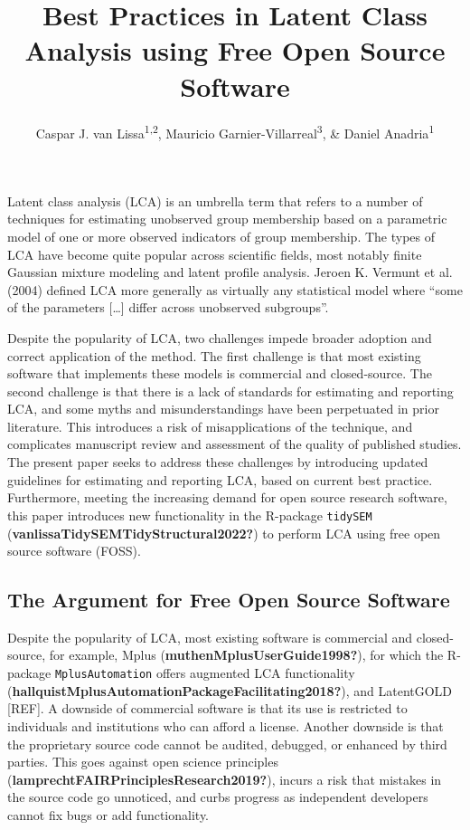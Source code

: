 \documentclass[
  ,man,floatsintext]{apa6}
\title{Best Practices in Latent Class Analysis using Free Open Source Software}
\author{Caspar J. van Lissa\textsuperscript{1,2}, Mauricio Garnier-Villarreal\textsuperscript{3}, \& Daniel Anadria\textsuperscript{1}}
\date{}
\affiliation{\vspace{0.5cm}\textsuperscript{1} Utrecht University, Methodology \& Statistics\\\textsuperscript{2} Open Science Community Utrecht\\\textsuperscript{3} Vrije Universiteit Amsterdam, Sociology}
\begin{document}
\maketitle

Latent class analysis (LCA) is an umbrella term that refers to a number
of techniques for estimating unobserved group membership based on a
parametric model of one or more observed indicators of group membership.
The types of LCA have become quite popular across scientific fields,
most notably finite Gaussian mixture modeling and latent profile
analysis. Jeroen K. Vermunt et al. (2004) defined LCA more generally as virtually
any statistical model where ``some of the parameters {[}\ldots{]} differ across
unobserved subgroups''.

Despite the popularity of LCA, two challenges impede broader adoption
and correct application of the method. The first challenge is that most
existing software that implements these models is commercial and
closed-source. The second challenge is that there is a lack of standards
for estimating and reporting LCA, and some myths and misunderstandings
have been perpetuated in prior literature. This introduces a risk of
misapplications of the technique, and complicates manuscript review and
assessment of the quality of published studies. The present paper seeks
to address these challenges by introducing updated guidelines for
estimating and reporting LCA, based on current best practice.
Furthermore, meeting the increasing demand for open source research
software, this paper introduces new functionality in the R-package
\texttt{tidySEM} (\textbf{vanlissaTidySEMTidyStructural2022?}) to perform LCA using free
open source software (FOSS).

\hypertarget{the-argument-for-free-open-source-software}{%
\subsection{The Argument for Free Open Source Software}\label{the-argument-for-free-open-source-software}}

Despite the popularity of LCA, most existing software is commercial and
closed-source, for example, Mplus (\textbf{muthenMplusUserGuide1998?}), for which
the R-package \texttt{MplusAutomation} offers augmented LCA functionality
(\textbf{hallquistMplusAutomationPackageFacilitating2018?}), and LatentGOLD
{[}REF{]}.
A
downside of commercial software is that its use is restricted to
individuals and institutions who can afford a license. Another downside
is that the proprietary source code cannot be audited, debugged, or
enhanced by third parties. This goes against open science principles
(\textbf{lamprechtFAIRPrinciplesResearch2019?}), incurs a risk that mistakes in
the source code go unnoticed, and curbs progress as independent
developers cannot fix bugs or add functionality.
\end{document}
